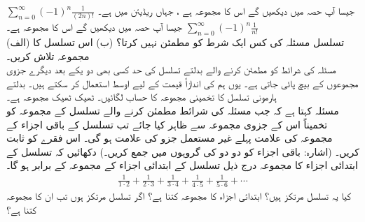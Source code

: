 $\sum\limits_{n=0}^{\infty}(-1)^n\frac{1}{(2n)!}$\quad
جیسا آپ حصہ  میں دیکھیں گے  اس کا مجموعہ  ہے ، جہاں  ریڈیئن میں ہے۔
$\sum\limits_{n=0}^{\infty}(-1)^n\frac{1}{n!}$\quad
جیسا آپ حصہ  میں دیکھیں گے  اس کا مجموعہ  ہے۔ 
\\
(الف) تسلسل  مسئلہ  کی کس ایک شرط کو مطمئن نہیں کرتا؟ (ب) اس تسلسل کا مجموعہ تلاش کریں۔
\\
مسئلہ  کی  شرائط کو مطمئن کرنے والے بدلتے تسلسل کی حد  کسی بھی دو یکے بعد دیگرے جزوی مجموعوں کے بیچ پائی جاتی ہے۔ یوں ہم  کی اندازاً قیمت کے لیے اوسط  استعمال کر سکتے ہیں۔ بدلتے ہارمونی تسلسل کا تخمینی مجموعہ  کا حساب لگائیں۔ ٹھیک ٹھیک مجموعہ  ہے۔
\\
مسئلہ  کہتا ہے کہ جب مسئلہ  کی شرائط مطمئن کرنے والے تسلسل  کے مجموعہ کو تخمیناً اس کے جزوی مجموعہ سے ظاہر کیا جائے تب تسلسل کے باقی اجزاء کے مجموعہ کی علامت پہلے غیر مستعمل جزو کی علامت ہو گی۔ اس فقرے کو ثابت کریں۔ (اشارہ: باقی اجزاء کو دو دو کی گروہوں میں جمع کریں۔)
دکھائیں کہ تسلسل  کے ابتدائی  اجزاء کا مجموعہ درج ذیل تسلسل کے ابتدائی  اجزاء کے مجموعہ کے برابر ہو گا۔
\begin{align*}
\frac{1}{1\cdot 2}+\frac{1}{2\cdot 3}+\frac{1}{3\cdot 4}+\frac{1}{4\cdot 5}+\frac{1}{5\cdot 6}+\cdots
\end{align*}
کیا یہ تسلسل مرتکز ہیں؟ ابتدائی  اجزاء کا مجموعہ کتنا ہے؟ اگر تسلسل مرتکز ہوں تب ان کا مجموعہ کتنا ہے؟
